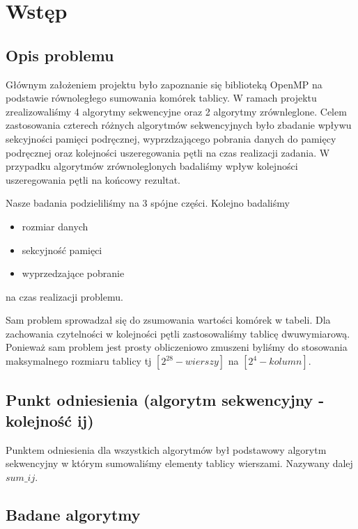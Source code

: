 \section{Wstęp}

\subsection{Opis problemu}

Głównym założeniem projektu było zapoznanie się biblioteką OpenMP na podstawie równoległego sumowania komórek tablicy. W ramach projektu zrealizowaliśmy 4 algorytmy sekwencyjne oraz 2 algorytmy zrównleglone. Celem zastosowania czterech różnych algorytmów sekwencyjnych było zbadanie wpływu sekcyjności pamięci podręcznej, wyprzdzającego pobrania danych do pamięcy podręcznej oraz kolejności uszeregowania pętli na czas realizacji zadania. W przypadku algorytmów zrównoleglonych badaliśmy wpływ kolejności uszeregowania pętli na końcowy rezultat.\newline

Nasze badania podzieliliśmy na 3 spójne części. Kolejno badaliśmy
\begin{itemize}
\item rozmiar danych
\item sekcyjność pamięci
\item wyprzedzające pobranie
\end{itemize}
na czas realizacji problemu.\newline

Sam problem sprowadzał się do zsumowania wartości komórek w tabeli. Dla zachowania czytelności w kolejności pętli zastosowaliśmy tablicę dwuwymiarową. Ponieważ sam problem jest prosty obliczeniowo zmuszeni byliśmy do stosowania maksymalnego rozmiaru tablicy tj $[2^{28} - wierszy]$ na $[2^{4} - kolumn]$.

\subsection{Punkt odniesienia (algorytm sekwencyjny - kolejność ij)}

Punktem odniesienia dla wszystkich algorytmów był podstawowy algorytm sekwencyjny w którym sumowaliśmy elementy tablicy wierszami. Nazywany dalej $sum\_ij$.




\subsection{Badane algorytmy}


